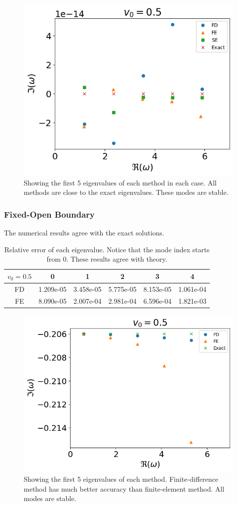 \begin{figure}[H]
	\centering
	\includegraphics[width=0.7\linewidth]{figures/fixed-fixed-constant-v-v0=0.5}
	\caption{Showing the first 5 eigenvalues of each method in each case. All methods are close to the exact eigenvalues. These modes are stable.}
	\label{fig:constant-v-dirichlet-subsonic}
\end{figure}


\subsubsection*{Fixed-Open Boundary}
The numerical results agree with the exact solutions.
\begin{table} [H]
	\centering
	\caption{Relative error of each eigenvalue. Notice that the mode index starts from 0. These results agree with theory.}
	\begin{tabular}{|c|c|c|c|c|c|}
		\hline
		$v_0=0.5$ & 0         & 1         & 2         & 3         & 4         \\
		\hline
		FD        & 1.209e-05 & 3.458e-05 & 5.775e-05 & 8.153e-05 & 1.061e-04 \\
		\hline
		FE        & 8.090e-05 & 2.007e-04 & 2.981e-04 & 6.596e-04 & 1.821e-03 \\
		\hline
	\end{tabular}
	\label{table:eigenvalue-error-fixed-opened-subsonic}
\end{table}

\begin{figure}[H]
	\centering
	\includegraphics[width=0.7\linewidth]{figures/fixed-open-constant-v-v0=0.5}
	\caption{Showing the first 5 eigenvalues of each method. Finite-difference method has much better accuracy than finite-element method. All modes are stable.}
	\label{fig:constant-v-fixed-opened-subsonic}
\end{figure}


